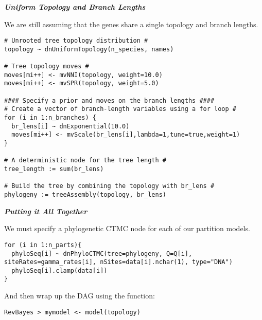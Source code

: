 \textbf{\textit{Uniform Topology and Branch Lengths}}

We are still assuming that the genes share a single topology and branch lengths.
{\tt \begin{snugshade*}
\begin{lstlisting}
# Unrooted tree topology distribution #
topology ~ dnUniformTopology(n_species, names)

# Tree topology moves #
moves[mi++] <- mvNNI(topology, weight=10.0)
moves[mi++] <- mvSPR(topology, weight=5.0)

#### Specify a prior and moves on the branch lengths #### 
# Create a vector of branch-length variables using a for loop #
for (i in 1:n_branches) {
  br_lens[i] ~ dnExponential(10.0)
  moves[mi++] <- mvScale(br_lens[i],lambda=1,tune=true,weight=1) 
}

# A deterministic node for the tree length #
tree_length := sum(br_lens)

# Build the tree by combining the topology with br_lens #
phylogeny := treeAssembly(topology, br_lens)
\end{lstlisting}
\end{snugshade*}}

\textbf{\textit{Putting it All Together}}

We must specify a phylogenetic CTMC node for each of our partition models.
{\tt \begin{snugshade*}
\begin{lstlisting}
for (i in 1:n_parts){
  phyloSeq[i] ~ dnPhyloCTMC(tree=phylogeny, Q=Q[i], siteRates=gamma_rates[i], nSites=data[i].nchar(1), type="DNA")
  phyloSeq[i].clamp(data[i])
}
\end{lstlisting}
\end{snugshade*}}


And then wrap up the DAG using the  function:
{\tt \begin{snugshade*}
\begin{lstlisting}
RevBayes > mymodel <- model(topology)
\end{lstlisting}
\end{snugshade*}}



